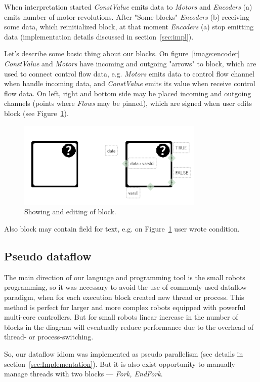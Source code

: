 \documentclass[conference,compsoc]{IEEEtran}
\begin{document}
When interpretation started \textit{ConstValue} emits data to \textit{Motors} and \textit{Encoders} (a) emits number of motor revolutions. After "Some blocks" \textit{Encoders} (b) receiving some data, which reinitialized block, at that moment \textit{Encoders} (a) stop emitting data (implementation details discussed in section~\ref{sec:impl}).

Let's describe some basic thing about our blocks. On figure~\ref{image:encoder} \textit{ConstValue} and \textit{Motors} have incoming and outgoing "arrows" to block, which are used to connect control flow data, e.g. \textit{Motors} emits data to control flow channel when handle incoming data, and \textit{ConstValue} emits its value when receive control flow data. On left, right and bottom side may be placed incoming and outgoing channels (points where \textit{Flows} may be pinned), which are signed when user edits block (see Figure~\ref{image:block}).
\begin{figure}[ht]
	\centering
	\includegraphics[width=3.5in]{block.png}
	\caption{Showing and editing of block.}
	\label{image:block}
\end{figure}
Also block may contain field for text, e.g. on Figure~\ref{image:block} user wrote condition.



\subsection{Pseudo dataflow}
The main direction of our language and programming tool is the small robots programming, so it was necessary to avoid the use of commonly used dataflow paradigm, when for each execution block created new thread or process. This method is perfect for larger and more complex robots equipped with powerful multi-core controllers. But for small robots linear increase in the number of blocks in the diagram will eventually reduce performance due to the overhead of thread- or process-switching.

So, our dataflow idiom was implemented as pseudo parallelism (see details in section~\ref{sec:Implementation}). But it is also exist opportunity to manually manage threads with two blocks --- \textit{Fork, EndFork}.
\end{document}
